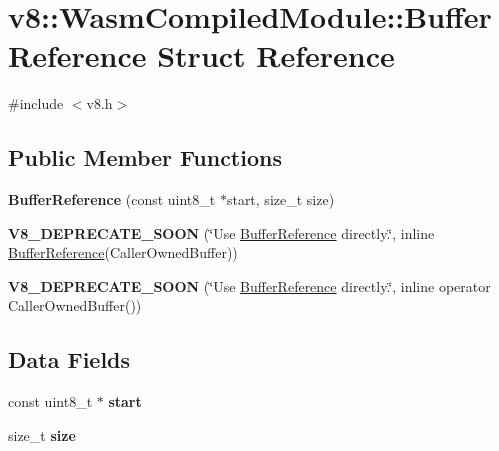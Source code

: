 \hypertarget{structv8_1_1WasmCompiledModule_1_1BufferReference}{}\section{v8\+:\+:Wasm\+Compiled\+Module\+:\+:Buffer\+Reference Struct Reference}
\label{structv8_1_1WasmCompiledModule_1_1BufferReference}


{\ttfamily \#include $<$v8.\+h$>$}

\subsection*{Public Member Functions}
\begin{DoxyCompactItemize}
\item 
\mbox{\label{structv8_1_1WasmCompiledModule_1_1BufferReference_ad46931134873606a9847ca2b5c464ec7}} 
{\bfseries Buffer\+Reference} (const uint8\+\_\+t $\ast$start, size\+\_\+t size)
\item 
\mbox{\label{structv8_1_1WasmCompiledModule_1_1BufferReference_ae9a670f69f77c52c31587aa7a78cb10d}} 
{\bfseries V8\+\_\+\+D\+E\+P\+R\+E\+C\+A\+T\+E\+\_\+\+S\+O\+ON} (\char`\"{}Use \mbox{\hyperlink{structv8_1_1WasmCompiledModule_1_1BufferReference}{Buffer\+Reference}} directly.\char`\"{}, inline \mbox{\hyperlink{structv8_1_1WasmCompiledModule_1_1BufferReference}{Buffer\+Reference}}(Caller\+Owned\+Buffer))
\item 
\mbox{\label{structv8_1_1WasmCompiledModule_1_1BufferReference_acaa803fdbdeb40f801f5021edc551d7b}} 
{\bfseries V8\+\_\+\+D\+E\+P\+R\+E\+C\+A\+T\+E\+\_\+\+S\+O\+ON} (\char`\"{}Use \mbox{\hyperlink{structv8_1_1WasmCompiledModule_1_1BufferReference}{Buffer\+Reference}} directly.\char`\"{}, inline operator Caller\+Owned\+Buffer())
\end{DoxyCompactItemize}
\subsection*{Data Fields}
\begin{DoxyCompactItemize}
\item 
\mbox{\label{structv8_1_1WasmCompiledModule_1_1BufferReference_a9ac4a0945b75f31d78b7b799571d1c62}} 
const uint8\+\_\+t $\ast$ {\bfseries start}
\item 
\mbox{\label{structv8_1_1WasmCompiledModule_1_1BufferReference_a8ea480c872a380496cd7f44c56f542cf}} 
size\+\_\+t {\bfseries size}
\end{DoxyCompactItemize}


